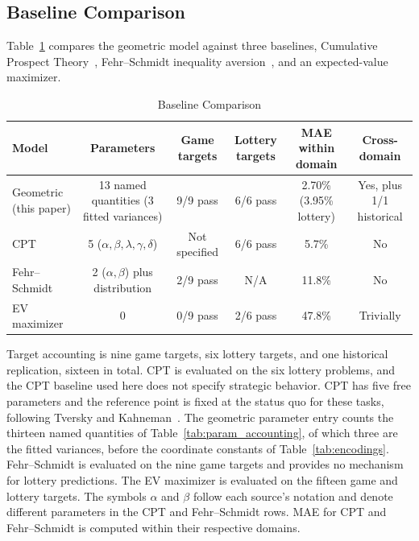 \documentclass[journal]{IEEEtran}
\begin{document}
\subsection{Baseline Comparison}

Table~\ref{tab:comparison} compares the geometric model against three baselines, Cumulative Prospect Theory~\cite{tversky1992}, Fehr--Schmidt inequality aversion~\cite{fehr1999}, and an expected-value maximizer.

\begin{table}[!t]
\renewcommand{\arraystretch}{1.2}
\caption{Baseline Comparison}
\label{tab:comparison}
\centering
\setlength{\tabcolsep}{4.5pt}
\begin{tabular}{l c c c c c}
\toprule
\textbf{Model} & \textbf{Parameters} & \textbf{Game targets} & \textbf{Lottery targets} & \textbf{MAE within domain} & \textbf{Cross-domain} \\
\midrule
Geometric (this paper) & 13 named quantities (3 fitted variances) & 9/9 pass & 6/6 pass & 2.70\% (3.95\% lottery) & Yes, plus 1/1 historical \\
CPT~\cite{tversky1992} & 5 ($\alpha,\beta,\lambda,\gamma,\delta$) & Not specified & 6/6 pass & 5.7\% & No \\
Fehr--Schmidt~\cite{fehr1999} & 2 ($\alpha,\beta$) plus distribution & 2/9 pass & N/A & 11.8\% & No \\
EV maximizer & 0 & 0/9 pass & 2/6 pass & 47.8\% & Trivially \\
\bottomrule
\end{tabular}
\begin{flushleft}
\footnotesize{Target accounting is nine game targets, six lottery targets, and one historical replication, sixteen in total.
CPT is evaluated on the six lottery problems, and the CPT baseline used here does not specify strategic behavior.
CPT has five free parameters and the reference point is fixed at the status quo for these tasks, following Tversky and Kahneman~\cite{tversky1992}.
The geometric parameter entry counts the thirteen named quantities of Table~\ref{tab:param_accounting}, of which three are the fitted variances, before the coordinate constants of Table~\ref{tab:encodings}.
Fehr--Schmidt is evaluated on the nine game targets and provides no mechanism for lottery predictions.
The EV maximizer is evaluated on the fifteen game and lottery targets. The symbols $\alpha$ and $\beta$ follow each source's notation and denote different parameters in the CPT and Fehr--Schmidt rows.
MAE for CPT and Fehr--Schmidt is computed within their respective domains.}
\end{flushleft}
\end{table}
\end{document}

